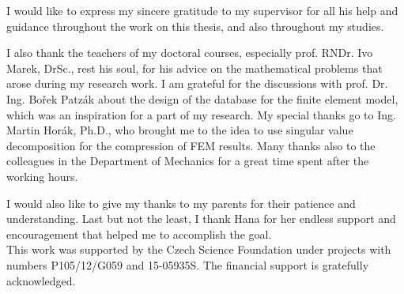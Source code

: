 \noindent
I would like to express my sincere gratitude to my supervisor \supname{} for all his help and guidance throughout the work on this thesis, and also throughout my studies.

I also thank the teachers of my doctoral courses, especially prof. RNDr. Ivo Marek, DrSc., rest his soul, for his advice on the mathematical problems that arose during my research work. I am grateful for the discussions with prof. Dr. Ing. Bo\v{r}ek Patz\'ak about the design of the database for the finite element model, which was an inspiration for a part of my research. My special thanks go to Ing. Martin Hor\'ak, Ph.D., who brought me to the idea to use singular value decomposition for the compression of FEM results. Many thanks also to the colleagues in the Department of Mechanics for a great time spent after the working hours.

I would also like to give my thanks to my parents for their patience and understanding. Last but not the least, I thank Hana for her endless support and encouragement that helped me to accomplish the goal.\\

This work was supported by the Czech Science Foundation under projects with numbers P105/12/G059 and 15-05935S. The financial support is gratefully acknowledged.
